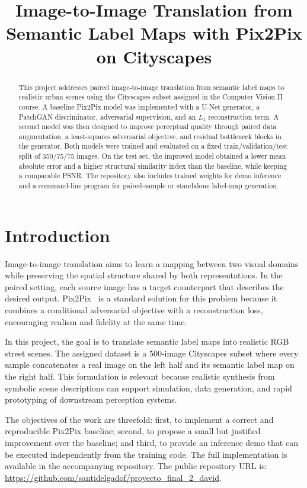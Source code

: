 \documentclass[conference]{IEEEtran}
\title{Image-to-Image Translation from Semantic Label Maps with Pix2Pix on Cityscapes}
\author{
\IEEEauthorblockN{Santiago Delgado Ferreiro and David Carballo Rodriguez}
\IEEEauthorblockA{Master in Artificial Intelligence\\
Computer Vision II}
}
\begin{document}
\maketitle

\begin{abstract}
This project addresses paired image-to-image translation from semantic label maps to realistic urban scenes using the Cityscapes subset assigned in the Computer Vision II course. A baseline Pix2Pix model was implemented with a U-Net generator, a PatchGAN discriminator, adversarial supervision, and an $L_1$ reconstruction term. A second model was then designed to improve perceptual quality through paired data augmentation, a least-squares adversarial objective, and residual bottleneck blocks in the generator. Both models were trained and evaluated on a fixed train/validation/test split of 350/75/75 images. On the test set, the improved model obtained a lower mean absolute error and a higher structural similarity index than the baseline, while keeping a comparable PSNR. The repository also includes trained weights for demo inference and a command-line program for paired-sample or standalone label-map generation.
\end{abstract}

\section{Introduction}
Image-to-image translation aims to learn a mapping between two visual domains while preserving the spatial structure shared by both representations. In the paired setting, each source image has a target counterpart that describes the desired output. Pix2Pix~\cite{isola2017pix2pix} is a standard solution for this problem because it combines a conditional adversarial objective with a reconstruction loss, encouraging realism and fidelity at the same time.

In this project, the goal is to translate semantic label maps into realistic RGB street scenes. The assigned dataset is a 500-image Cityscapes subset where every sample concatenates a real image on the left half and its semantic label map on the right half. This formulation is relevant because realistic synthesis from symbolic scene descriptions can support simulation, data generation, and rapid prototyping of downstream perception systems.

The objectives of the work are threefold: first, to implement a correct and reproducible Pix2Pix baseline; second, to propose a small but justified improvement over the baseline; and third, to provide an inference demo that can be executed independently from the training code. The full implementation is available in the accompanying repository. The public repository URL is: \url{https://github.com/santidelgadof/proyecto_final_2_david}.
\end{document}
